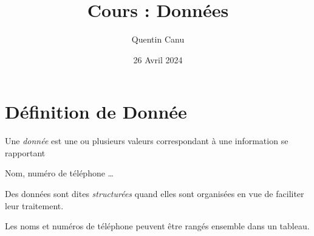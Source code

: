 \documentclass{article}
\title{Cours : Données}
\date{26 Avril 2024}
\author{Quentin Canu}
\begin{document}
\maketitle
\section{Définition de Donnée}
\begin{definition}
Une \emph{donnée} est une ou plusieurs valeurs correspondant à une information se rapportant    
\end{definition}
\begin{example}
Nom, numéro de téléphone \dots    
\end{example}
\begin{definition}
Des données sont dites \emph{structurées} quand elles sont organisées en vue de faciliter leur traitement.     
\end{definition}
\begin{example}
Les noms et numéros de téléphone peuvent être rangés ensemble dans un tableau.    
\end{example}
\end{document}
